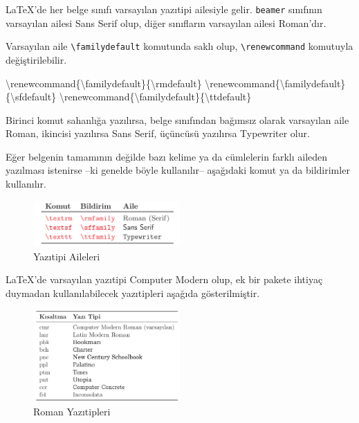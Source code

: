 \documentclass[
  10pt,
]{scrbook}
\newenvironment{Shaded}{\begin{snugshade}}{\end{snugshade}}
\newcommand{\ExtensionTok}[1]{#1}
\newcommand{\FunctionTok}[1]{\textcolor[rgb]{0.00,0.00,0.00}{#1}}
\newcommand{\NormalTok}[1]{#1}
\theoremstyle{definition}
\theoremstyle{definition}
\theoremstyle{definition}
\theoremstyle{definition}
\theoremstyle{remark}
\begin{document}
LaTeX'de her belge sınıfı varsayılan yazıtipi ailesiyle gelir. \texttt{beamer} sınıfının varsayılan ailesi Sans Serif olup, diğer sınıfların varsayılan ailesi Roman'dır.

Varsayılan aile \texttt{\textbackslash{}familydefault} komutunda saklı olup, \texttt{\textbackslash{}renewcommand} komutuyla değiştirilebilir.

\begin{Shaded}
\begin{Highlighting}[]
\FunctionTok{\textbackslash{}renewcommand}\NormalTok{\{}\ExtensionTok{\textbackslash{}familydefault}\NormalTok{\}\{}\FunctionTok{\textbackslash{}rmdefault}\NormalTok{\}  }
\FunctionTok{\textbackslash{}renewcommand}\NormalTok{\{}\ExtensionTok{\textbackslash{}familydefault}\NormalTok{\}\{}\FunctionTok{\textbackslash{}sfdefault}\NormalTok{\}  }
\FunctionTok{\textbackslash{}renewcommand}\NormalTok{\{}\ExtensionTok{\textbackslash{}familydefault}\NormalTok{\}\{}\FunctionTok{\textbackslash{}ttdefault}\NormalTok{\} }
\end{Highlighting}
\end{Shaded}

Birinci komut sahanlığa yazılırsa, belge sınıfından bağımsız olarak varsayılan aile Roman, ikincisi yazılırsa Sans Serif, üçüncüsü yazılırsa Typewriter olur.

Eğer belgenin tamamının değilde bazı kelime ya da cümlelerin farklı aileden yazılması istenirse --ki genelde böyle kullanılır-- aşağıdaki komut ya da bildirimler kullanılır.

\begin{figure}
\centering
\includegraphics[width=0.5\textwidth,height=\textheight]{images/yazitipi.png}
\caption{Yazıtipi Aileleri}
\end{figure}

LaTeX'de varsayılan yazıtipi Computer Modern olup, ek bir pakete ihtiyaç duymadan kullanılabilecek yazıtipleri aşağıda gösterilmiştir.

\begin{figure}
\centering
\includegraphics[width=0.5\textwidth,height=\textheight]{images/yazitipi2.png}
\caption{Roman Yazıtipleri}
\end{figure}
\end{document}
